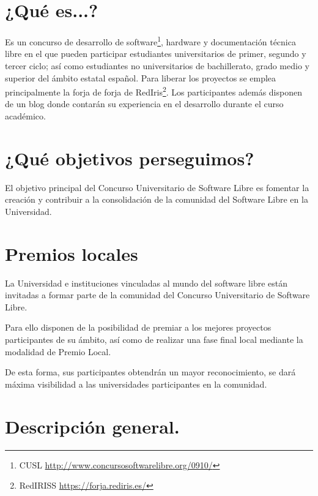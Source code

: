
\section*{¿Qué es...?}

Es un concurso de desarrollo de software\footnote{CUSL
\url{http://www.concursosoftwarelibre.org/0910/}}, hardware y documentación
técnica libre en el que pueden participar estudiantes universitarios de primer,
segundo y tercer ciclo; así como estudiantes no universitarios de bachillerato,
grado medio y superior del ámbito estatal español. Para liberar los proyectos se
emplea principalmente la forja de forja de RedIris\footnote{RedIRISS
\url{https://forja.rediris.es/}}. Los participantes además
disponen de un blog donde contarán su experiencia en el desarrollo durante el
curso académico.

\section*{¿Qué objetivos perseguimos?}

El objetivo principal del Concurso Universitario de Software Libre es fomentar
la creación y contribuir a la consolidación de la comunidad del Software Libre
en la Universidad.

\section*{Premios locales}

La Universidad e instituciones vinculadas al mundo del software libre están
invitadas a formar parte de la comunidad del Concurso Universitario de Software
Libre.

Para ello disponen de la posibilidad de premiar a los mejores proyectos
participantes de su ámbito, así como de realizar una fase final local mediante
la modalidad de Premio Local.

De esta forma, sus participantes obtendrán un mayor reconocimiento, se dará
máxima visibilidad a las universidades participantes en la comunidad.
\section*{Descripción general.}

